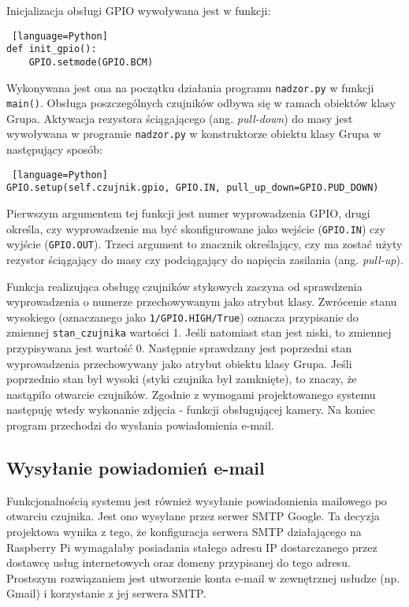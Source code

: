 \documentclass[a4paper,11pt,twoside]{article}
\begin{document}
Inicjalizacja obsługi GPIO wywoływana jest w funkcji:  
\begin{lstlisting} [language=Python]
def init_gpio():
    GPIO.setmode(GPIO.BCM)
\end{lstlisting}
Wykonywana jest ona na początku działania programu \texttt{nadzor.py} w funkcji \texttt{main()}. Obsługa poszczególnych czujników odbywa się w ramach obiektów klasy Grupa. Aktywacja rezystora ściągającego (ang. \textit{pull-down}) do masy jest wywoływana w programie \texttt{nadzor.py} w konstruktorze obiektu klasy Grupa w następujący sposób:
\begin{lstlisting} [language=Python]
GPIO.setup(self.czujnik.gpio, GPIO.IN, pull_up_down=GPIO.PUD_DOWN)
\end{lstlisting}
Pierwszym argumentem tej funkcji jest numer wyprowadzenia GPIO, drugi określa, czy wyprowadzenie ma być skonfigurowane jako wejście (\texttt{GPIO.IN}) czy wyjście (\texttt{GPIO.OUT}). Trzeci argument to znacznik określający, czy ma zostać użyty rezystor ściągający do masy czy podciągający do napięcia zasilania (ang. \textit{pull-up}).

Funkcja realizująca obsługę czujników stykowych zaczyna od sprawdzenia wyprowadzenia o numerze przechowywanym jako atrybut klasy. Zwrócenie stanu wysokiego (oznaczanego jako \texttt{1/GPIO.HIGH/True}) oznacza przypisanie do zmiennej \texttt{stan{\_}czujnika} wartości 1. Jeśli natomiast stan jest niski, to zmiennej przypisywana jest wartość 0. Następnie sprawdzany jest poprzedni stan wyprowadzenia przechowywany jako atrybut obiektu klasy Grupa. Jeśli poprzednio stan był wysoki (styki czujnika był zamknięte), to znaczy, że nastąpiło otwarcie czujników. Zgodnie z wymogami projektowanego systemu następuję wtedy wykonanie zdjęcia - funkcji obsługującej kamery. Na koniec program przechodzi do wysłania powiadomienia e-mail.

\subsection{Wysyłanie powiadomień e-mail}
Funkcjonalnością systemu jest również wysyłanie powiadomienia mailowego po otwarciu czujnika. Jest ono wysyłane przez serwer SMTP Google. Ta decyzja projektowa wynika z tego, że konfiguracja serwera SMTP działającego na Raspberry Pi wymagałaby posiadania stałego adresu IP dostarczanego przez dostawcę usług internetowych oraz domeny przypisanej do tego adresu. Prostszym rozwiązaniem jest utworzenie konta e-mail w zewnętrznej usłudze (np. Gmail) i korzystanie z jej serwera SMTP. 
\end{document}
